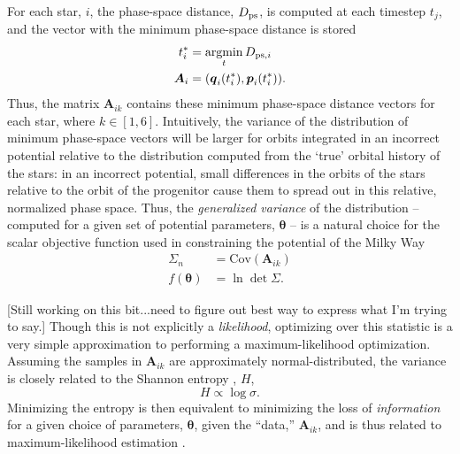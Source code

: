 \documentclass[preprint]{aastex}
\newcommand{\bs}{\boldsymbol}
\newcommand{\argmin}{\operatornamewithlimits{argmin}}
\begin{document}
For each star, $i$,
the phase-space distance, $D_{\rm ps}$, is computed at each timestep
$t_{j}$, and the vector with the minimum phase-space distance is stored
\begin{align}
  t^*_{i} &= \argmin_{t} D_{{\rm ps},i}\\
  \bs{A}_{i} &= (\bs{q}_{i}(t^*_{i}),\bs{p}_{i}(t^*_{i})).
\end{align}
Thus, the matrix $\bs{A}_{ik}$ contains these minimum phase-space
distance vectors for each star, where $k\in[1,6]$. Intuitively, the
variance of the distribution of minimum phase-space vectors will be
larger for orbits integrated in an incorrect potential relative to the
distribution computed from the `true' orbital history of the stars: in
an incorrect potential, small differences in the orbits of the stars
relative to the orbit of the progenitor cause them to spread out in
this relative, normalized phase space. Thus, the \emph{generalized
  variance} of the distribution -- computed for a given set of
potential parameters, $\bs{\theta}$ -- is a natural choice for the
scalar objective function used in constraining the potential of the
Milky Way
\begin{align}
  \Sigma_n &= \mathrm{Cov}( \bs{A}_{ik}) \\
  f(\bs{\theta}) &= \ln \det \Sigma.
\end{align}

[Still working on this bit...need to figure out best way to express
  what I'm trying to say.] Though this is not explicitly a
\emph{likelihood}, optimizing over this statistic is a very simple
approximation to performing a maximum-likelihood
optimization. Assuming the samples in $\bs{A}_{ik}$ are approximately
normal-distributed, the variance is closely related to the Shannon
entropy \citep{shannon1948}, $H$,
\begin{equation}
  H \propto \log \sigma .
\end{equation}
Minimizing the entropy is then equivalent to minimizing the loss of
\emph{information} for a given choice of parameters, $\bs{\theta}$,
given the ``data,'' $\bs{A}_{ik}$, and is thus related to
maximum-likelihood estimation \citep[see][for more
  detail]{mackay2002}.
\end{document}
